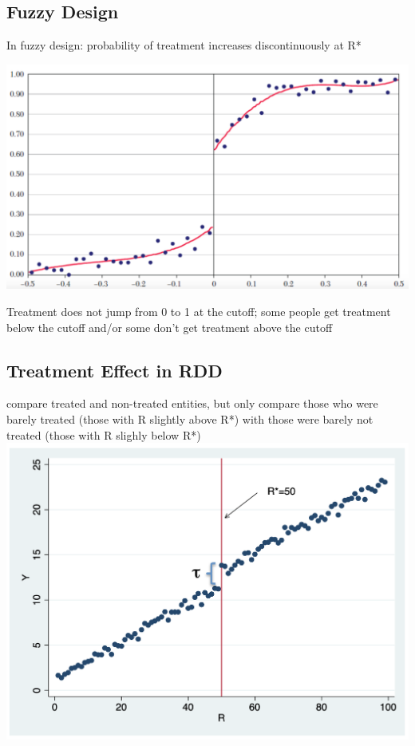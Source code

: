 \documentclass[a3paper, 8pt]{extarticle}
\begin{document}
\begin{multicols*}{5}
\subsection{Fuzzy Design}
In fuzzy design: probability of treatment increases discontinuously at R*

\includegraphics[width = \columnwidth]{Screen Shot 2023-05-30 at 14.31.58.png}

Treatment does not jump from 0 to 1 at the cutoff; some people get treatment below the cutoff and/or some don't get treatment above the cutoff

\subsection{Treatment Effect in RDD}
compare treated and non-treated entities, but only compare those who were barely treated (those with R slightly above R*) with those were barely not treated (those with R slighly below R*)
\includegraphics[width = \columnwidth]{Screen Shot 2023-05-30 at 15.12.59.png}


\end{multicols*}
\end{document}
